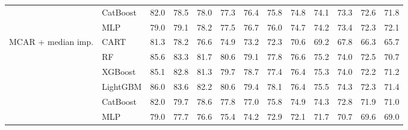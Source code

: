 \begin{table}[p]
\begin{tabular}{@{}llrrrrrrrrrrr@{}}
 & CatBoost & 82.0 & 78.5 & 78.0 & 77.3 & 76.4 & 75.8 & 74.8 & 74.1 & 73.3 & 72.6 & 71.8 \\
 & MLP & 79.0 & 79.1 & 78.2 & 77.5 & 76.7 & 76.0 & 74.7 & 74.2 & 73.4 & 72.3 & 72.1 \\
\midrule
MCAR + median imp. & CART & 81.3 & 78.2 & 76.6 & 74.9 & 73.2 & 72.3 & 70.6 & 69.2 & 67.8 & 66.3 & 65.7 \\
 & RF & 85.6 & 83.3 & 81.7 & 80.6 & 79.1 & 77.8 & 76.6 & 75.2 & 74.0 & 72.5 & 70.7 \\
 & XGBoost & 85.1 & 82.8 & 81.3 & 79.7 & 78.7 & 77.4 & 76.4 & 75.3 & 74.0 & 72.2 & 71.2 \\
 & LightGBM & 86.0 & 83.6 & 82.2 & 80.6 & 79.4 & 78.1 & 76.4 & 75.5 & 74.3 & 72.3 & 71.4 \\
 & CatBoost & 82.0 & 79.7 & 78.6 & 77.8 & 77.0 & 75.8 & 74.9 & 74.3 & 72.8 & 71.9 & 71.0 \\
 & MLP & 79.0 & 77.7 & 76.6 & 75.4 & 74.2 & 72.9 & 72.1 & 71.7 & 70.7 & 69.6 & 69.0 \\
\bottomrule
\end{tabular}
\end{table}

